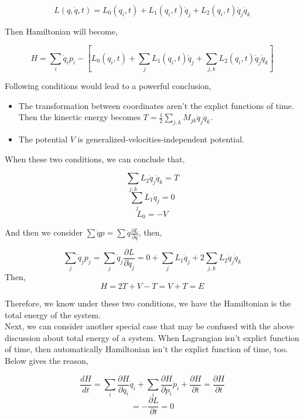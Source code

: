 \documentclass[12pt]{article}
\numberwithin{equation}{section}
\begin{document}
\begin{center}
    \[ L(q, \dot{q}, t) = L_0(q_i, t) + L_1(q_i, t) \dot{q}_j + L_2(q_i, t)\dot{q}_j\dot{q}_k \]
\end{center}

Then Hamiltonian will become,

\begin{center}
    \[ H = \sum_i{\dot{q}_i p_i} - \left[ L_0(q_i, t) + \sum_{j}{L_1(q_i, t) \dot{q}_j} + \sum_{j,k}{L_2(q_i, t)\dot{q}_j\dot{q}_k}\right]\]
\end{center}

Following conditions would lead to a powerful conclusion,

\begin{itemize}
    \item The transformation between coordinates aren't the explict functions of time. Then the kinectic energy becomes $T = \frac{1}{2}\sum_{j, k}{M_{jk}\dot{q}_j\dot{q}_k}$.
    \item The potential $V$ is generalized-velocities-independent potential.
\end{itemize}

When these two conditions, we can conclude that,
\begin{center}
    \[ \sum_{j, k}{L_2\dot{q}_j\dot{q}_k} = T \]
    \[ \sum_{j}{L_1\dot{q}_j} = 0 \]
    \[ L_0 = -V \]
\end{center} 

And then we consider $\sum{\dot{q}p} = \sum{\dot{q}\frac{\partial L}{\partial \dot{q}}}$, then,

\begin{center}
    \[ \sum_{j}{\dot{q}_jp_j} = \sum_{j}{\dot{q}_j \frac{\partial L}{\partial \dot{q}_j}} = 0 + \sum_{j}{L_1\dot{q}_j} + 2 \sum_{j, k}{L_2 \dot{q}_j\dot{q}_k} \]
    Then,
    \[ H = 2T + V - T = V + T = E \]
\end{center}

Therefore, we know under these two conditions, we have the Hamiltonian is the total energy of the system.
\\
\indent Next, we can consider another special case that may be confused with the above discussion about total energy of a system. When Lagrangian isn't explict function of time, then automatically Hamiltonian isn't the explict function of time, too. Below gives the reason,

\begin{center}
    \[ \frac{dH}{dt} = \sum_{i}{\frac{\partial H}{\partial q_i}\dot{q}_i} + \sum_{i}{\frac{\partial H}{\partial p_i}\dot{p}_i} + \frac{\partial H}{\partial t} = \frac{\partial H}{\partial t} \]
    \[ = -\frac{\partial L}{\partial t} = 0 \]
\end{center}
\end{document}
